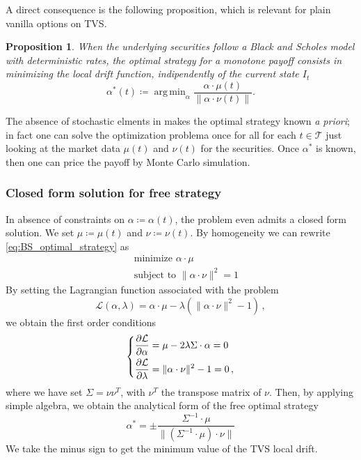 \documentclass[11pt]{article}
\newtheorem{proposition}[theorem]{Proposition}
\DeclareMathOperator*{\argmin}{arg\,min}
\newenvironment{eqsys}{\begin{equation}\begin{dcases}}{\end{dcases}\end{equation}}
\begin{document}
A direct consequence is the following proposition, which is relevant for plain vanilla options on TVS.

\begin{proposition}
When the underlying securities follow a Black and Scholes model with deterministic rates, the optimal strategy for a monotone payoff consists in minimizing the local drift function, indipendently of the current state $I_t$
\begin{equation}
    \alpha^*(t) \coloneqq \argmin_\alpha \frac{\alpha \cdot \mu(t)}{\|\alpha \cdot \nu(t) \|}.
\label{eq:BS_optimal_strategy}\end{equation}
\end{proposition}
The absence of stochastic elments in  makes the optimal strategy known \textit{a priori}; in fact one can solve the optimization problema once for all for each $t \in \mathcal{T}$ just looking at the market data $\mu(t)$ and $\nu(t)$ for the securities. Once $\alpha^*$ is known, then one can price the payoff by Monte Carlo simulation. 
\subsubsection{Closed form solution for free strategy}
In absence of constraints on $\alpha \coloneqq \alpha(t)$, the problem even admits a closed form solution. We set $\mu \coloneqq \mu(t)$ and $\nu \coloneqq \nu(t)$. By homogeneity we can rewrite \eqref{eq:BS_optimal_strategy} as
\begin{equation}
	\boxed{
		\begin{aligned}
			&\text { minimize } \alpha \cdot \mu\\
			&\text { subject to } \|\alpha \cdot \nu\|^2=1
	\end{aligned}}
\end{equation}
By setting the Lagrangian function associated with the problem
\begin{equation}
	\mathcal{L}\left(\alpha, \lambda\right)=\alpha \cdot \mu-\lambda\left(\|\alpha \cdot \nu\|^2-1\right) \, ,
\end{equation}
we obtain the first order conditions
\begin{eqsys}
	\frac{\partial \mathcal{L}}{\partial \alpha}=\mu -2\lambda \Sigma \cdot \alpha=0 \\
	\frac{\partial \mathcal{L}}{\partial \lambda}= \|\alpha \cdot \nu\|^2-1=0
	\, ,
\end{eqsys}
where we have set $\Sigma = \nu  \nu^T$, with $\nu^T$ the transpose matrix of $\nu$.
Then, by applying simple algebra, we obtain the analytical form of the free optimal strategy
\begin{equation}
	\alpha^* = \pm \frac{\Sigma^{-1} \cdot \mu}{\|(\Sigma^{-1} \cdot \mu)\cdot \nu\|}
\end{equation}
We take the minus sign to get the minimum value of the TVS local drift. 
\end{document}
